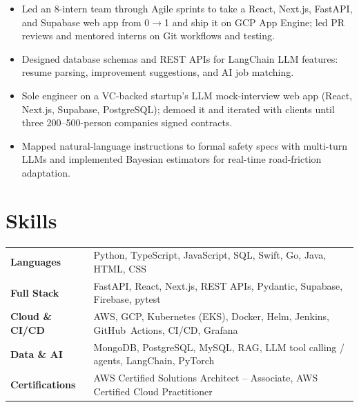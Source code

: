 \documentclass[11pt, letterpaper]{article}
\begin{document}
\begin{itemize}
  \item Led an 8-intern team through Agile sprints to take a React, Next.js, FastAPI, and Supabase web app from 0$\to$1 and ship it on GCP App Engine; led PR reviews and mentored interns on Git workflows and testing.
  \item Designed database schemas and REST APIs for LangChain LLM features: resume parsing, improvement suggestions, and AI job matching.
\end{itemize}

\begin{itemize}
  \item Sole engineer on a VC-backed startup's LLM mock-interview web app (React, Next.js, Supabase, PostgreSQL); demoed it and iterated with clients until three 200--500-person companies signed contracts.
\end{itemize}

\begin{itemize}
  \item Mapped natural-language instructions to formal safety specs with multi-turn LLMs and implemented Bayesian estimators for real-time road-friction adaptation.
\end{itemize}

\section{Skills}
\begin{tabularx}{\textwidth}{@{}l @{\hspace{7pt}} >{\raggedright\arraybackslash}X@{}}
  \textbf{Languages} & Python, TypeScript, JavaScript, SQL, Swift, Go, Java, HTML, CSS \\[1pt]
  \textbf{Full Stack} & FastAPI, React, Next.js, REST APIs, Pydantic, Supabase, Firebase, pytest \\[1pt]
  \textbf{Cloud \& CI/CD} & AWS, GCP, Kubernetes (EKS), Docker, Helm, Jenkins, GitHub~Actions, CI/CD, Grafana \\[1pt]
  \textbf{Data \& AI} & MongoDB, PostgreSQL, MySQL, RAG, LLM tool calling / agents, LangChain, PyTorch \\[1pt]
  \textbf{Certifications} & AWS Certified Solutions Architect -- Associate, AWS Certified Cloud Practitioner \\
\end{tabularx}
\end{document}
